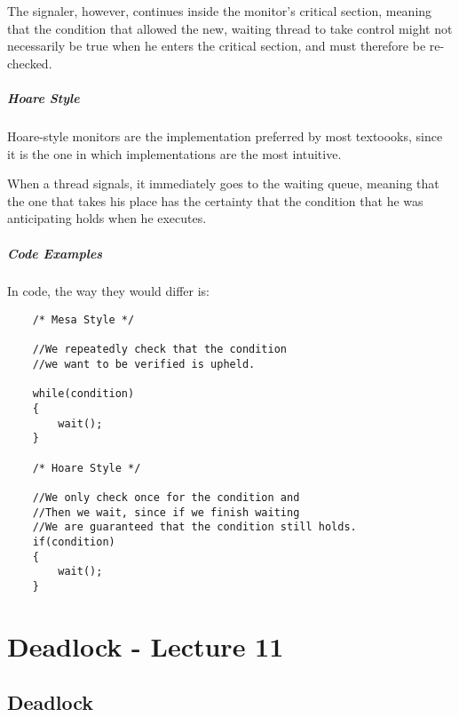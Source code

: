 \documentclass[openright, twoside]{report}
\theoremstyle{definition}
\theoremstyle{example}
\begin{document}
	The signaler, however, continues inside the monitor's critical section,
	meaning that the condition that allowed the new, waiting thread to take 
	control might not necessarily be true when he enters the critical section,
	and must therefore be re-checked.
	
	\paragraph{Hoare Style}
	Hoare-style monitors are the implementation preferred by most textoooks, 
	since it is the one in which implementations are the most intuitive.

	When a thread signals, it immediately goes to the waiting queue, meaning that 
	the one that takes his place has the certainty that the condition that 
	he was anticipating holds when he executes.

	\paragraph{Code Examples}

	In code, the way they would differ is:

	\begin{lstlisting}
	/* Mesa Style */

	//We repeatedly check that the condition
	//we want to be verified is upheld.
					 
	while(condition)
	{ 
		wait();		
	}

	/* Hoare Style */

	//We only check once for the condition and 
	//Then we wait, since if we finish waiting
	//We are guaranteed that the condition still holds.
	if(condition)	
	{				
		wait();		
	}
	\end{lstlisting}
	


\chapter{Deadlock - Lecture 11}


	\section{Deadlock}
\end{document}
